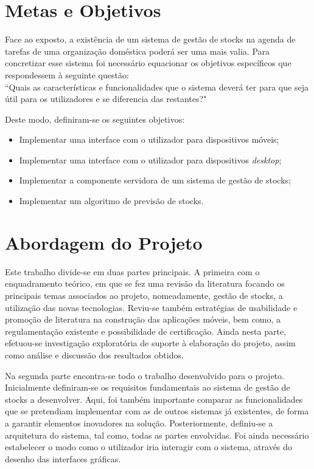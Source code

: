 \section{Metas e Objetivos} \label{sec12}
Face ao exposto, a existência de um sistema de gestão de stocks na agenda de tarefas de uma organização doméstica poderá ser uma mais valia. Para concretizar esse sistema foi necessário equacionar os objetivos específicos que respondessem à seguinte questão: \\
``Quais as características e funcionalidades que o sistema deverá ter para que seja útil para os utilizadores e se diferencia das restantes?"

Deste modo, definiram-se os seguintes objetivos:
\begin{itemize} \itemsep 0pt
	\item Implementar uma interface com o utilizador para dispositivos móveis;
	\item Implementar uma interface com o utilizador para dispositivos \textit{desktop};
	\item Implementar a componente servidora de um sistema de gestão de stocks;
	\item Implementar um algoritmo de previsão de stocks.
\end{itemize}

%
%
\section{Abordagem do Projeto} \label{sec13}

Este trabalho divide-se em duas partes principais. A primeira com o enquadramento teórico, em que se fez uma revisão da literatura focando os principais temas associados ao projeto, nomeadamente, gestão de stocks, a utilização das novas tecnologias. Reviu-se também estratégias de usabilidade e promoção de literatura na construção das aplicações móveis, bem como, a regulamentação existente e possibilidade de certificação.
Ainda nesta parte, efetuou-se investigação exploratória de suporte à elaboração do projeto, assim como análise e discussão dos resultados obtidos.

Na segunda parte encontra-se todo o trabalho desenvolvido para o projeto. Inicialmente definiram-se os requisitos fundamentais ao sistema de gestão de stocks a desenvolver. Aqui, foi também importante comparar as funcionalidades que se pretendiam implementar com as de outros sistemas já existentes, de forma a garantir elementos inovadores na solução. Posteriormente, definiu-se a arquitetura do sistema, tal como, todas as partes envolvidas. Foi ainda necessário estabelecer o modo como o utilizador iria interagir com o sistema, através do desenho das interfaces gráficas.

